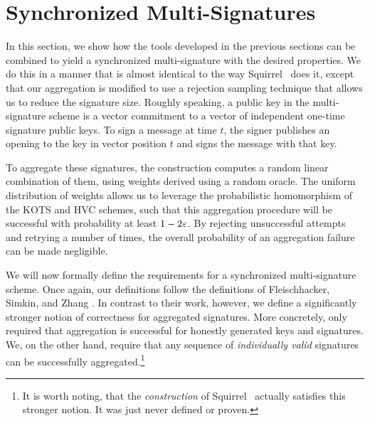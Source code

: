 
\section{Synchronized Multi-Signatures}\label{sec:nidv}

In this section, we show how the tools developed in the previous sections can be combined to yield a synchronized multi-signature with the desired properties.
We do this in a manner that is almost identical to the way Squirrel~\cite{CCS:FleSimZha22} does it, except that our aggregation is modified to use a rejection sampling technique that allows us to reduce the signature size.
Roughly speaking, a public key in the multi-signature scheme is a vector commitment to a vector of independent one-time signature public keys.
To sign a message at time $t$, the signer publishes an opening to the key in vector position $t$ and signs the message with that key.

To aggregate these signatures, the construction computes a random linear combination of them, using weights derived using a random oracle.
The uniform distribution of weights allows us to leverage the probabilistic homomorphism of the KOTS and HVC schemes, such that this aggregation procedure will be successful with probability at least $1-2\varepsilon$.
By rejecting unsuccessful attempts and retrying a number of times, the overall probability of an aggregation failure can be made negligible.

We will now formally define the requirements for a synchronized multi-signature scheme.
Once again, our definitions follow the definitions of Fleischhacker, Simkin, and Zhang \cite{CCS:FleSimZha22}.
In contrast to their work, however, we define a significantly stronger notion of correctness for aggregated signatures.
More concretely, \cite{CCS:FleSimZha22} only required that aggregation is successful for honestly generated keys and signatures.
We, on the other hand, require that any sequence of \emph{individually valid} signatures can be successfully aggregated.\footnote{It is worth noting, that the  \emph{construction} of Squirrel~\cite{CCS:FleSimZha22} actually satisfies this stronger notion. It was just never defined or proven.}

